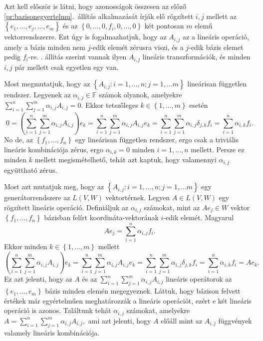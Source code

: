 \documentclass[a4paper, showtrims]{memoir}
\makeatletter
\renewenvironment{proof}[1][\proofname]
    {\par\pushQED{\qed}%
    \normalfont \topsep6\p@\@plus6\p@\relax
    \trivlist
    \item[\hskip\labelsep
        \itshape
    #1\@addpunct{:}]\ignorespaces}
    {\popQED\endtrivlist\@endpefalse}
\theoremstyle{plain}
\theoremstyle{remark}
\theoremstyle{definition}
\makeatother
\begin{document}
\begin{proof}
    Azt kell először is látni, hogy  azonosságok összesen az előző \ref{pr:bazisonegyertelmu}.~állítás
	alkalmazását írják elő rögzített $i,j$ mellett az
	\begin{math}
		\left\{ e_1,\ldots,e_j,\ldots,e_m \right\}
	\end{math}
	és az
	\begin{math}
		\left\{ 0,\ldots,0,f_i,0,\ldots,0 \right\}
	\end{math}
	két pontosan $m$ elemű vektorrendszerre.
	Ezt úgy is fogalmazhatjuk, hogy az $A_{i,j}$ az a lineáris operáció,
	amely a bázis minden nem $j$-edik elemét zérusra viszi, és a $j$-edik bázis elemet
	pedig $f_i$-re.
    . állítás szerint vannak ilyen $A_{i,j}$ lineáris transzformációk,
	és minden $i,j$ pár mellett csak egyetlen egy van.

	Most megmutatjuk, hogy az $\left\{ A_{i,j}:i=1,\ldots,n;j=1,\dots m \right\}$ lineárisan független
	rendszer.
	Legyenek az $\alpha_{i,j}\in\mathbb{F}$ számok olyanok,
	amelyekre
	\begin{math}
		\sum_{i=1}^n\sum_{j=1}^m\alpha_{i,j}A_{i,j}=0.
	\end{math}
	Ekkor tetszőleges $k\in\left\{ 1,\ldots,m \right\}$ esetén
	\[
		0=
		\left( \sum_{i=1}^n\sum_{j=1}^m\alpha_{i,j}A_{i,j} \right)e_k
		=
		\sum_{i=1}^n\sum_{j=1}^m\alpha_{i,j}A_{i,j}e_k
		=
		\sum_{i=1}^n\sum_{j=1}^m\alpha_{i,j}\delta_{j,k}f_i
		=
		\sum_{i=1}^n\alpha_{i,k}f_i.
	\]
	No de, az $\left\{f_1,\ldots,f_n  \right\}$ egy lineárisan független rendszer,
	ergo csak a  triviális lineáris kombinációja zérus,
	ergo $\alpha_{i,k}=0$ minden $i=1,\ldots,n$ mellett.
	Persze ez minden $k$ mellett megismételhető, tehát azt kaptuk, hogy valamennyi $\alpha_{i,j}$ együttható
	zérus.

	Most azt mutatjuk meg, hogy az $\left\{ A_{i,j}:i=1,\ldots,n;j=1,\dots m \right\}$ egy
	generátorrendszere az $L\left( V,W \right)$ vektortérnek.
	Legyen $A\in L\left( V,W \right)$ egy rögzített lineáris operáció.
	Definiáljuk az $\alpha_{i,j}$ számokat,
	mint az $Ae_{j}\in W$ vektor $\left\{ f_1,\ldots,f_n \right\}$ bázisban felírt koordináta-vektorának
	$i$-edik elemét.
	Magyarul
	\[
		Ae_j=
		\sum_{i=1}^n\alpha_{i,j}f_i.
	\]
	Ekkor minden $k\in\left\{ 1,\ldots,m \right\}$ mellett
	\[
		\left( \sum_{i=1}^n\sum_{j=1}^m\alpha_{i,j}A_{i,j} \right)e_k
		=
		\sum_{i=1}^n\sum_{j=1}^m\alpha_{i,j}A_{i,j}e_k
		=
		\sum_{i=1}^n\sum_{j=1}^m\alpha_{i,j}\delta_{j,k}f_i
		=
		\sum_{i=1}^n\alpha_{i,k}f_i
		=Ae_k.
	\]
	Ez azt jelenti, hogy az $A$ és az
	\begin{math}
		\sum_{i=1}^n\sum_{j=1}^m\alpha_{i,j}A_{i,j}
	\end{math}
	lineáris operátorok az $\left\{ e_1,\ldots,e_m \right\}$ bázis minden elemén megegyeznek.
	Láttuk, hogy bázison felvett értékek már egyértelműen meghatározzák a lineáris operációt,
	ezért e két lineáris operáció is azonos.
	Találtunk tehát $\alpha_{i,j}$ számokat, amelyekre
	\begin{math}
		A=
		\sum_{i=1}^n\sum_{j=1}^m\alpha_{i,j}A_{i,j},
	\end{math}
	ami azt jelenti, hogy $A$ előáll mint az $A_{i,j}$ függvények valamely lineáris kombinációja.
\end{proof}
\end{document}

